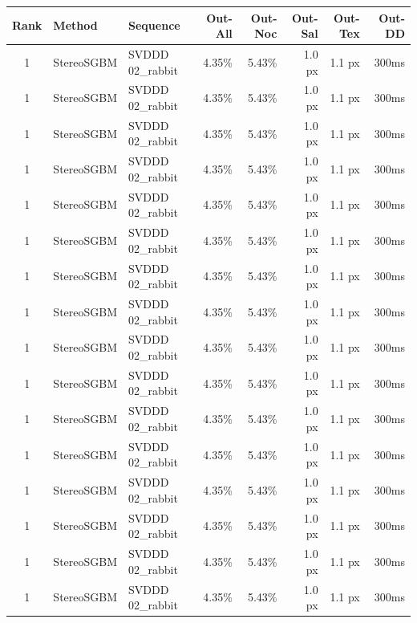 \begin{landscape}
  \begin{table}[h!]
  \centering
  \begin{tabular}{cll|rrrrr}
    \hline
    \textbf{Rank} & \textbf{Method} & \textbf{Sequence} & \textbf{Out-All} & \textbf{Out-Noc} & \textbf{Out-Sal} & \textbf{Out-Tex} & \textbf{Out-DD} \\ \hline \hline
    1 & StereoSGBM & SVDDD 02\_rabbit & 4.35\% & \cellcolor{green!60}5.43\% & 1.0 px & 1.1 px & 300ms \\
    1 & StereoSGBM & SVDDD 02\_rabbit & 4.35\% & \cellcolor{green!60}5.43\% & 1.0 px & 1.1 px & 300ms \\
    1 & StereoSGBM & SVDDD 02\_rabbit & 4.35\% & \cellcolor{green!60}5.43\% & 1.0 px & 1.1 px & 300ms \\
    1 & StereoSGBM & SVDDD 02\_rabbit & 4.35\% & \cellcolor{green!60}5.43\% & 1.0 px & 1.1 px & 300ms \\
    1 & StereoSGBM & SVDDD 02\_rabbit & 4.35\% & \cellcolor{green!60}5.43\% & 1.0 px & 1.1 px & 300ms \\
    1 & StereoSGBM & SVDDD 02\_rabbit & 4.35\% & \cellcolor{green!60}5.43\% & 1.0 px & 1.1 px & 300ms \\
    1 & StereoSGBM & SVDDD 02\_rabbit & 4.35\% & \cellcolor{green!60}5.43\% & 1.0 px & 1.1 px & 300ms \\
    1 & StereoSGBM & SVDDD 02\_rabbit & 4.35\% & \cellcolor{green!60}5.43\% & 1.0 px & 1.1 px & 300ms \\
    1 & StereoSGBM & SVDDD 02\_rabbit & 4.35\% & \cellcolor{green!60}5.43\% & 1.0 px & 1.1 px & 300ms \\
    1 & StereoSGBM & SVDDD 02\_rabbit & 4.35\% & \cellcolor{green!60}5.43\% & 1.0 px & 1.1 px & 300ms \\
    1 & StereoSGBM & SVDDD 02\_rabbit & 4.35\% & \cellcolor{green!60}5.43\% & 1.0 px & 1.1 px & 300ms \\
    1 & StereoSGBM & SVDDD 02\_rabbit & 4.35\% & \cellcolor{green!60}5.43\% & 1.0 px & 1.1 px & 300ms \\
    1 & StereoSGBM & SVDDD 02\_rabbit & 4.35\% & \cellcolor{green!60}5.43\% & 1.0 px & 1.1 px & 300ms \\
    1 & StereoSGBM & SVDDD 02\_rabbit & 4.35\% & \cellcolor{green!60}5.43\% & 1.0 px & 1.1 px & 300ms \\
    1 & StereoSGBM & SVDDD 02\_rabbit & 4.35\% & \cellcolor{green!60}5.43\% & 1.0 px & 1.1 px & 300ms \\
    1 & StereoSGBM & SVDDD 02\_rabbit & 4.35\% & \cellcolor{green!60}5.43\% & 1.0 px & 1.1 px & 300ms \\

\end{tabular}
\end{table}
\end{landscape}
